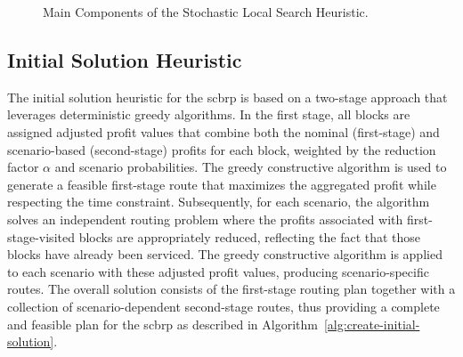\begin{figure}[h!]
	\caption{Main Components of the Stochastic Local Search Heuristic.}
	\label{fig:stochastic-local-search-heuristic}
\end{figure}

\subsection{Initial Solution Heuristic}

The initial solution heuristic for the \gls{scbrp} is based on a two-stage approach that leverages deterministic greedy algorithms. In the first stage, all blocks are assigned adjusted profit values that combine both the nominal (first-stage) and scenario-based (second-stage) profits for each block, weighted by the reduction factor $\alpha$ and scenario probabilities. The greedy constructive algorithm is used to generate a feasible first-stage route that maximizes the aggregated profit while respecting the time constraint. Subsequently, for each scenario, the algorithm solves an independent routing problem where the profits associated with first-stage-visited blocks are appropriately reduced, reflecting the fact that those blocks have already been serviced. The greedy constructive algorithm is applied to each scenario with these adjusted profit values, producing scenario-specific routes. The overall solution consists of the first-stage routing plan together with a collection of scenario-dependent second-stage routes, thus providing a complete and feasible plan for the \gls{scbrp} as described in Algorithm~\ref{alg:create-initial-solution}.

